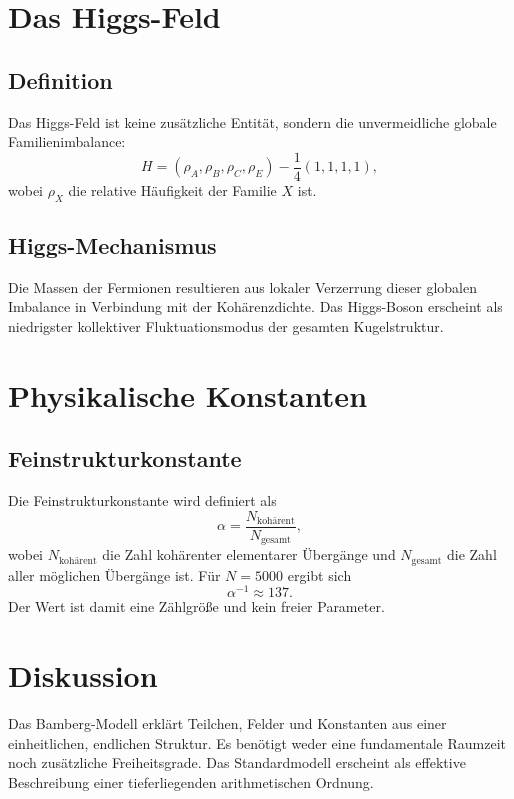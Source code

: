 \documentclass[11pt,a4paper]{article}
\begin{document}
\section{Das Higgs-Feld}

\subsection{Definition}

Das Higgs-Feld ist keine zusätzliche Entität,
sondern die unvermeidliche
globale Familienimbalance:
\[
H =
(\rho_A,\rho_B,\rho_C,\rho_E)
- \frac14(1,1,1,1),
\]
wobei $\rho_X$
die relative Häufigkeit der Familie $X$ ist.

\subsection{Higgs-Mechanismus}

Die Massen der Fermionen
resultieren aus lokaler Verzerrung
dieser globalen Imbalance
in Verbindung mit der Kohärenzdichte.
Das Higgs-Boson erscheint
als niedrigster kollektiver Fluktuationsmodus
der gesamten Kugelstruktur.

\section{Physikalische Konstanten}

\subsection{Feinstrukturkonstante}

Die Feinstrukturkonstante wird definiert als
\[
\alpha
=
\frac{N_{\text{kohärent}}}{N_{\text{gesamt}}},
\]
wobei $N_{\text{kohärent}}$
die Zahl kohärenter elementarer Übergänge
und $N_{\text{gesamt}}$
die Zahl aller möglichen Übergänge ist.
Für $N=5000$ ergibt sich
\[
\alpha^{-1}\approx 137.
\]
Der Wert ist damit eine Zählgröße
und kein freier Parameter.

\section{Diskussion}

Das Bamberg-Modell
erklärt Teilchen, Felder und Konstanten
aus einer einheitlichen,
endlichen Struktur.
Es benötigt weder
eine fundamentale Raumzeit
noch zusätzliche Freiheitsgrade.
Das Standardmodell erscheint
als effektive Beschreibung
einer tieferliegenden arithmetischen Ordnung.
\end{document}
